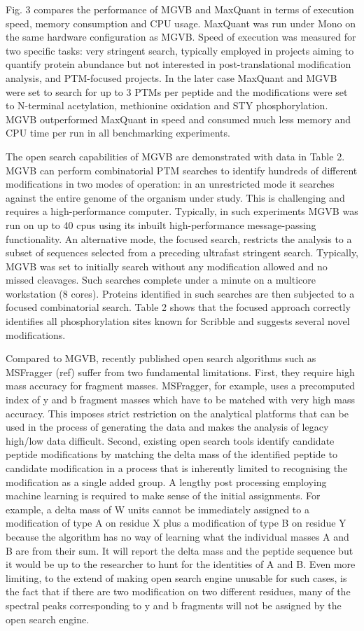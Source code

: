 \documentclass[sn-standardnature]{sn-jnl}%
\theoremstyle{thmstyleone}%
\theoremstyle{thmstyletwo}%
\theoremstyle{thmstylethree}%
\begin{document}
Fig. 3 compares the performance of MGVB and MaxQuant in terms of execution speed, memory consumption and CPU usage. MaxQuant was run under Mono on the same hardware configuration as MGVB. Speed of execution was measured for two specific tasks:  very stringent search, typically employed in projects aiming to quantify protein abundance but not interested in post-translational modification analysis, and PTM-focused projects. In the later case MaxQuant and MGVB were set to search for up to 3 PTMs per peptide and the modifications were set to N-terminal acetylation, methionine oxidation and STY phosphorylation. MGVB outperformed MaxQuant in speed and consumed much less memory and CPU time per run in all benchmarking experiments.

The open search capabilities of MGVB are demonstrated with data in Table 2. MGVB can perform combinatorial PTM searches to identify hundreds of different modifications in two modes of operation: in an unrestricted mode it searches against the entire genome of the organism under study. This is challenging and requires a high-performance computer. Typically, in such experiments MGVB was run on up to 40 cpus using its inbuilt high-performance message-passing functionality. An alternative mode, the focused search, restricts the analysis to a subset of sequences selected from a preceding ultrafast stringent search. Typically, MGVB was set to initially search without any modification allowed and no missed cleavages. Such searches complete under a minute on a multicore workstation (8 cores). Proteins identified in such searches are then subjected to a focused combinatorial search. Table 2 shows that the focused approach correctly identifies all phosphorylation sites known for Scribble and suggests several novel modifications. 

Compared to MGVB, recently published open search algorithms such as MSFragger (ref) suffer from two fundamental limitations. First, they require high mass accuracy for fragment masses. MSFragger, for example, uses a precomputed index of y and b fragment masses which have to be matched with very high mass accuracy. This imposes  strict restriction on the analytical platforms that can be used in the process of generating the data and makes the analysis of legacy high/low data difficult. Second, existing open search tools identify candidate peptide modifications by matching the delta mass of the identified peptide to candidate modification in a process that is inherently limited to recognising the modification as a single added group. A lengthy post processing employing machine learning is required to make sense of the initial assignments. For example, a delta mass of W units cannot be immediately assigned to a modification of type A on residue X plus a modification of type B on residue Y because the algorithm has no way of learning what the individual  masses A and B are from their sum. It will report the delta mass and the peptide sequence but it would be up to the researcher to hunt for the identities of A and B. Even more limiting, to the extend of making open search engine unusable for such cases, is the fact that if there are two modification on two different residues, many of the spectral peaks corresponding to y and b fragments will not be assigned by the open search engine.
\end{document}
